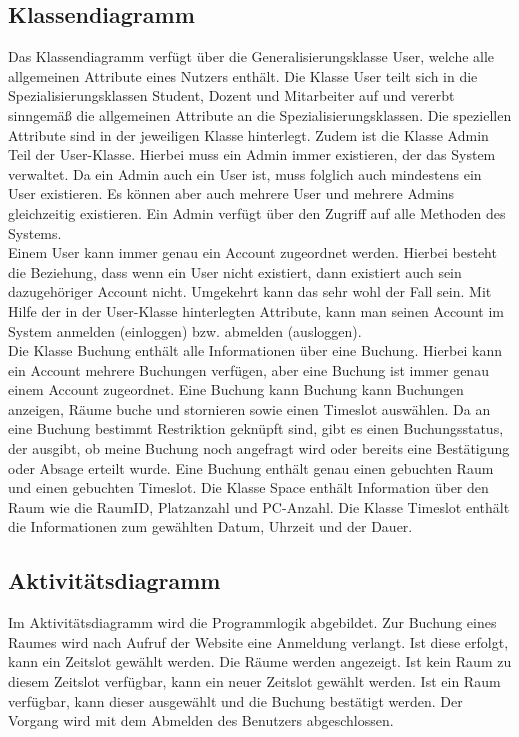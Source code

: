 \documentclass[a4paper,12pt]{article}
\begin{document}
\subsection{Klassendiagramm}
Das Klassendiagramm verfügt über die Generalisierungsklasse User, welche alle allgemeinen Attribute eines Nutzers enthält. Die Klasse User teilt sich in die Spezialisierungsklassen Student, Dozent und Mitarbeiter auf und vererbt sinngemäß die allgemeinen Attribute an die Spezialisierungsklassen. Die speziellen Attribute sind in der jeweiligen Klasse hinterlegt. Zudem ist die Klasse Admin Teil der User-Klasse. Hierbei muss ein Admin immer existieren, der das System verwaltet. Da ein Admin auch ein User ist, muss folglich auch mindestens ein User existieren. Es können aber auch mehrere User und mehrere Admins gleichzeitig existieren. Ein Admin verfügt über den Zugriff auf alle Methoden des Systems.\\
Einem User kann immer genau ein Account zugeordnet werden. Hierbei besteht die Beziehung, dass wenn ein User nicht existiert, dann existiert auch sein dazugehöriger Account nicht. Umgekehrt kann das sehr wohl der Fall sein. Mit Hilfe der in der User-Klasse hinterlegten Attribute, kann man seinen Account im System anmelden (einloggen) bzw. abmelden (ausloggen).\\
Die Klasse Buchung enthält alle Informationen über eine Buchung. Hierbei kann ein Account mehrere Buchungen verfügen, aber eine Buchung ist immer genau einem Account zugeordnet. Eine Buchung kann Buchung kann Buchungen anzeigen, Räume buche und stornieren sowie einen Timeslot auswählen. Da an eine Buchung bestimmt Restriktion geknüpft sind, gibt es einen Buchungsstatus, der ausgibt, ob meine Buchung noch angefragt wird oder bereits eine Bestätigung oder Absage erteilt wurde. Eine Buchung enthält genau einen gebuchten Raum und einen gebuchten Timeslot. Die Klasse Space enthält Information über den Raum wie die RaumID, Platzanzahl und PC-Anzahl. Die Klasse Timeslot enthält die Informationen zum gewählten Datum, Uhrzeit und der Dauer.
\label{Klassendiagramm}

\subsection{Aktivitätsdiagramm}
Im Aktivitätsdiagramm wird die Programmlogik abgebildet. Zur Buchung eines Raumes wird nach Aufruf der Website eine Anmeldung verlangt. Ist diese erfolgt, kann ein Zeitslot gewählt werden. Die Räume werden angezeigt. Ist kein Raum zu diesem Zeitslot verfügbar, kann ein neuer Zeitslot gewählt werden. Ist ein Raum verfügbar, kann dieser ausgewählt und die Buchung bestätigt werden. Der Vorgang wird mit dem Abmelden des Benutzers abgeschlossen.\\
\end{document}
